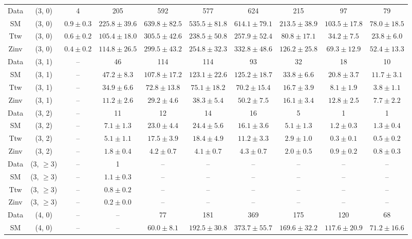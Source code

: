 \begin{table}[h!]
{\begin{tabular}{cccccccccc}
	Data & (3, 0) & 4 & 205 & 592 & 577 & 624 & 215 & 97 & 79 \\[0.5ex] 
	SM & (3, 0) & $0.9\pm 0.3$ & $225.8\pm 39.6$ & $639.8\pm 82.5$ & $535.5\pm 81.8$ & $614.1\pm 79.1$ & $213.5\pm 38.9$ & $103.5\pm 17.8$ & $78.0\pm 18.5$ \\[0.5ex] 
	Ttw & (3, 0) & $0.6\pm 0.2$ & $105.4\pm 18.0$ & $305.5\pm 42.6$ & $238.5\pm 50.8$ & $257.9\pm 52.4$ & $80.8\pm 17.1$ & $34.2\pm 7.5$ & $23.8\pm 6.0$ \\[0.5ex] 
	Zinv & (3, 0) & $0.4\pm 0.2$ & $114.8\pm 26.5$ & $299.5\pm 43.2$ & $254.8\pm 32.3$ & $332.8\pm 48.6$ & $126.2\pm 25.8$ & $69.3\pm 12.9$ & $52.4\pm 13.3$ \\[0.5ex] 
	Data & (3, 1) & -- & 46 & 114 & 114 & 93 & 32 & 18 & 10 \\[0.5ex] 
	SM & (3, 1) & -- & $47.2\pm 8.3$ & $107.8\pm 17.2$ & $123.1\pm 22.6$ & $125.2\pm 18.7$ & $33.8\pm 6.6$ & $20.8\pm 3.7$ & $11.7\pm 3.1$ \\[0.5ex] 
	Ttw & (3, 1) & -- & $34.9\pm 6.6$ & $72.8\pm 13.8$ & $75.1\pm 18.2$ & $70.2\pm 15.4$ & $16.7\pm 3.9$ & $8.1\pm 1.9$ & $3.8\pm 1.1$ \\[0.5ex] 
	Zinv & (3, 1) & -- & $11.2\pm 2.6$ & $29.2\pm 4.6$ & $38.3\pm 5.4$ & $50.2\pm 7.5$ & $16.1\pm 3.4$ & $12.8\pm 2.5$ & $7.7\pm 2.2$ \\[0.5ex] 
	Data & (3, 2) & -- & 11 & 12 & 14 & 16 & 5 & 1 & 1 \\[0.5ex] 
	SM & (3, 2) & -- & $7.1\pm 1.3$ & $23.0\pm 4.4$ & $24.4\pm 5.6$ & $16.1\pm 3.6$ & $5.1\pm 1.3$ & $1.2\pm 0.3$ & $1.3\pm 0.4$ \\[0.5ex] 
	Ttw & (3, 2) & -- & $5.1\pm 1.1$ & $17.5\pm 3.9$ & $18.4\pm 4.9$ & $11.2\pm 3.3$ & $2.9\pm 1.0$ & $0.3\pm 0.1$ & $0.5\pm 0.2$ \\[0.5ex] 
	Zinv & (3, 2) & -- & $1.8\pm 0.4$ & $4.2\pm 0.7$ & $4.1\pm 0.7$ & $4.3\pm 0.7$ & $2.0\pm 0.5$ & $0.9\pm 0.2$ & $0.8\pm 0.3$ \\[0.5ex] 
	Data & (3, $\ge3$) & -- & 1 & -- & -- & -- & -- & -- & -- \\[0.5ex] 
	SM & (3, $\ge3$) & -- & $1.1\pm 0.3$ & -- & -- & -- & -- & -- & -- \\[0.5ex] 
	Ttw & (3, $\ge3$) & -- & $0.8\pm 0.2$ & -- & -- & -- & -- & -- & -- \\[0.5ex] 
	Zinv & (3, $\ge3$) & -- & $0.2\pm 0.0$ & -- & -- & -- & -- & -- & -- \\[0.5ex] 
	Data & (4, 0) & -- & -- & 77 & 181 & 369 & 175 & 120 & 68 \\[0.5ex] 
	SM & (4, 0) & -- & -- & $60.0\pm 8.1$ & $192.5\pm 30.8$ & $373.7\pm 55.7$ & $169.6\pm 32.2$ & $117.6\pm 20.9$ & $71.2\pm 16.6$ \\[0.5ex] 

\end{tabular}}
\end{table}
